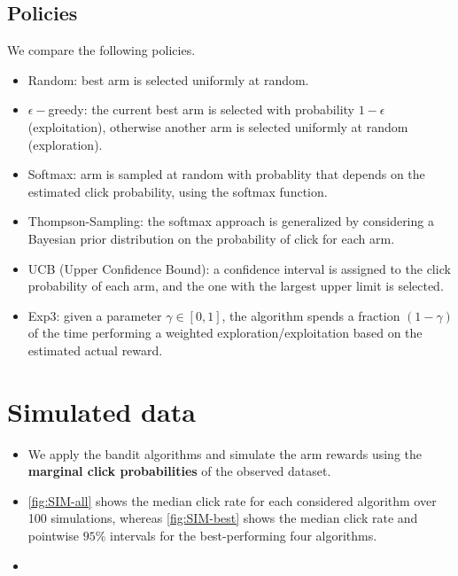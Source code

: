 \documentclass[a0,portrait]{a0poster}
\begin{document}
\begin{multicols}{2}
\subsection*{Policies}

We compare the following policies.
\begin{itemize}
    \item Random: best arm is selected uniformly at random.
    \item $\epsilon-$greedy: the current best arm is selected with probability $1-\epsilon$ (exploitation), otherwise another arm is selected uniformly at random (exploration).
    \item Softmax: arm is sampled at random with probablity that depends on the estimated click probability, using the softmax function.
    \item Thompson-Sampling: the softmax approach is generalized by considering a Bayesian prior distribution on the probability of click for each arm.
    \item UCB (Upper Confidence Bound): a confidence interval is assigned to the click probability of each arm, and the one with the largest upper limit is selected.
    \item Exp3: given a parameter $\gamma \in[0, 1]$, the algorithm spends a fraction $(1 - \gamma)$ of the time performing a weighted exploration/exploitation based on the estimated
    actual reward. %
\end{itemize}



\color{DarkRed}
\section*{Simulated data}
\color{Black}
\begin{itemize}
    \item[] We apply the bandit algorithms and simulate the arm rewards using the \textbf{marginal click probabilities} of the observed dataset.
    \item[] \autoref{fig:SIM-all} shows the median click rate for each considered algorithm over 100 simulations, whereas \autoref{fig:SIM-best} shows the median click rate and pointwise $95\%$ intervals for the best-performing four algorithms.
    \item[] 
\end{itemize}


\end{multicols}
\end{document}
